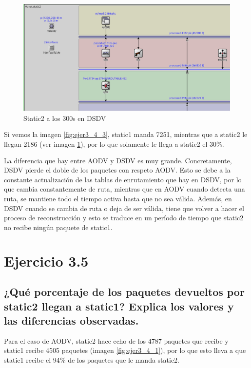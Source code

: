 \begin{figure}[H]
    \centering
    \includegraphics[width=155mm, scale=0.75]{imaxes/aodv_dsdv/ejercicio3_4_static2_dsdv.png}
    \caption{Static2 a los 300s en DSDV}
    \label{fig:ejer3_4_4}
\end{figure}

Si vemos la imagen \ref{fig:ejer3_4_3}, static1 manda 7251, mientras que a static2 le llegan 2186 (ver imagen \ref{fig:ejer3_4_4}), por lo que solamente le llega a static2 el 30\%.

La diferencia que hay entre AODV y DSDV es muy grande. Concretamente, DSDV pierde el doble de los paquetes con respeto AODV. Esto se debe a la constante actualización de las tablas de enrutamiento que hay en DSDV, por lo que cambia constantemente de ruta, mientras que en AODV cuando detecta una ruta, se mantiene todo el tiempo activa hasta que no sea válida. Además, en DSDV cuando se cambia de ruta o deja de ser válida, tiene que volver a hacer el proceso de reconstrucción y esto se traduce en un período de tiempo que static2 no recibe ningún paquete de static1. 


\section{Ejercicio 3.5}

\subsection{¿Qué porcentaje de los paquetes devueltos por static2 llegan a static1? Explica los valores y las diferencias
observadas.}

Para el caso de AODV, static2 hace echo de los 4787 paquetes que recibe y static1 recibe 4505 paquetes (imagen \ref{fig:ejer3_4_1}), por lo que esto lleva a que static1 recibe el 94\% de los paquetes que le manda static2.

